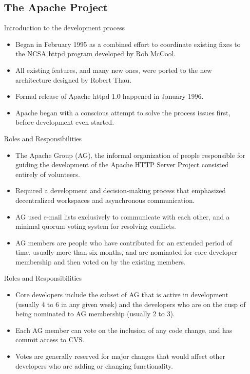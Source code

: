 \documentclass{beamer}
\begin{document}
\subsection{The Apache Project}
\begin{frame}{Introduction to the development process}
\begin{itemize}
	\item Began in February 1995 as a combined effort to coordinate existing fixes to the NCSA httpd program developed by Rob McCool.\pause
	\item All existing features, and many new ones, were ported to the new architecture designed by Robert Thau.\pause
	\item Formal release of Apache httpd 1.0 happened in January 1996.\pause
	\item Apache began with a conscious attempt to solve the process issues first, before development even started.
\end{itemize}
\end{frame}

\begin{frame}{Roles and Responsibilities}
\begin{itemize}
	\item The Apache Group (AG), the informal organization of people responsible for guiding the development of the Apache HTTP Server Project consisted entirely of volunteers.\pause
	\item Required a development and decision-making process that emphasized decentralized workspaces and asynchronous communication.\pause
	\item AG used e-mail lists exclusively to communicate with each other, and a minimal quorum voting system for resolving conflicts.\pause
	\item AG members are people who have contributed for an extended period of time, usually more than six months, and are nominated for core developer membership and then voted on by the existing members.	
\end{itemize}
\end{frame}

\begin{frame}{Roles and Responsibilities}
\begin{itemize}
	\item Core developers include the subset of AG that is active in development (usually 4 to 6 in any given week) and the developers who are on the cusp of being nominated to AG membership (usually 2 to 3). \pause
	\item Each AG member can vote on the inclusion of any code change, and has commit access to CVS. \pause
	\item Votes are generally reserved for major changes that would affect other developers who are adding or changing functionality. 
\end{itemize}
\end{frame}
\end{document}
